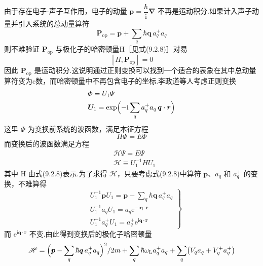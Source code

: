 由于存在电子-声子互作用，电子的动量 $\boldsymbol{p}=\dfrac{\hbar}{\mathrm{i}}\boldsymbol{\nabla}$ 不再是运动积分.如果计入声子动量并引入系统的总动量算符
\begin{equation}
  \boldsymbol{P}_{\mathrm{op}}=\boldsymbol{p}
  +\sum_{q}\hbar\boldsymbol{q}\,a_{q}^{+}a_{q}
\end{equation}
则不难验证 $\boldsymbol{P}_{\mathrm{op}}$ 与极化子的哈密顿量H［见式(9.2.8)］对易
\begin{equation}
  \left[H,\boldsymbol{P}_{\mathrm{op}}\right]=0
\end{equation}
因此 $\boldsymbol{P}_{\mathrm{op}}$ 是运动积分.这说明通过正则变换可以找到一个适合的表象在其中总动量算符变为c数，而哈密顿量中不再包含电子的坐标.李政道等人考虑正则变换
\begin{equation}
\begin{aligned}
  &\varPhi=U_{1}\varPsi\\
  &\boldsymbol{U}_{1}=\exp\Bigl(-\mathrm{i}\sum_{q}a_{q}^{+}a_{q}\,
  \boldsymbol{q}\cdot\boldsymbol{r}\Bigr)
\end{aligned}
\end{equation}
这里 $\varPhi$ 为变换前系统的波函数，满足本征方程
\begin{equation}
  H\varPhi=E\varPhi
\end{equation}
而变换后的波函数满足方程
\begin{equation}
\begin{aligned}
  &\mathscr{H}\varPsi=E\varPsi\\
  &\mathscr{H}\equiv U_{1}^{-1}HU_{1}
\end{aligned}
\end{equation}
其中 H 由式(9.2.8)表示.为了求得 $\mathscr{H}$，只要考虑式(9.2.8)中算符 $\boldsymbol{p}$、$a_{q}$ 和 $a_{q}^{+}$ 的变换，不难算得
\begin{equation}
\left.
\begin{aligned}
  &U_{1}^{-1}\boldsymbol{p}U_{1}
  =\boldsymbol{p}-\sum_{q}\hbar\boldsymbol{q}\,a_{q}^{+}a_{q}\\
  &U_{1}^{-1}a_{q}U_{1}=a_{q}\mathrm{e}^{-\mathrm{i}\boldsymbol{q}\cdot\boldsymbol{r}}\\
  &U_{1}^{-1}a_{q}^{+}U_{1}=a_{q}^{+}\mathrm{e}^{\mathrm{i}\boldsymbol{q}\cdot\boldsymbol{r}}
\end{aligned}\right\}
\end{equation}
而 $\mathrm{e}^{\mathrm{i}\boldsymbol{q}\cdot\boldsymbol{r}}$ 不变.由此得到变换后的极化子哈密顿量
\begin{equation}
  \mathscr{H}=\Bigl(\boldsymbol{p}-\sum_{q}\hbar\boldsymbol{q}\,a_{q}^{+}a_{q}\Bigr)^{2}/2m
  +\sum_{q}\hbar\omega_{\mathrm L}a_{q}^{+}a_{q}
  +\sum_{q}\bigl(V_{q}a_{q}+V_{q}^{+}a_{q}^{+}\bigr)
\end{equation}
